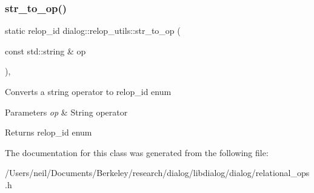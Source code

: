 \subsubsection{\texorpdfstring{str\+\_\+to\+\_\+op()}{str\_to\_op()}}
{\footnotesize\ttfamily static relop\+\_\+id dialog\+::relop\+\_\+utils\+::str\+\_\+to\+\_\+op (\begin{DoxyParamCaption}\item[{const std\+::string \&}]{op }\end{DoxyParamCaption})\hspace{0.3cm}{\ttfamily [inline]}, {\ttfamily [static]}}

Converts a string operator to relop\+\_\+id enum


\begin{DoxyParams}{Parameters}
{\em op} & String operator \\
\hline
\end{DoxyParams}
\begin{DoxyReturn}{Returns}
relop\+\_\+id enum 
\end{DoxyReturn}


The documentation for this class was generated from the following file\+:\begin{DoxyCompactItemize}
\item 
/\+Users/neil/\+Documents/\+Berkeley/research/dialog/libdialog/dialog/relational\+\_\+ops.\+h\end{DoxyCompactItemize}
